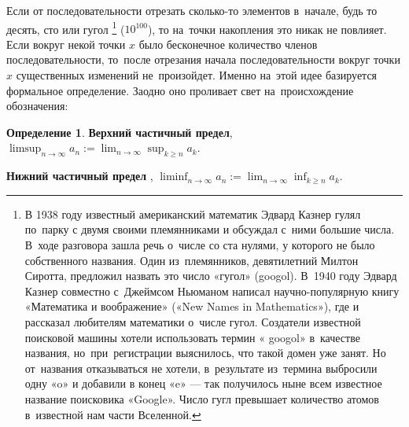 \documentclass[pdftex, 12pt, a4paper]{article}
\renewcommand{\to}{\rightarrow}
\renewcommand{\geq}{\geqslant}
\theoremstyle{definition} %
\newtheorem*{mydef}{Определение}
\numberwithin{problem}{section}
\newcommand{\indef}[1]{\textbf{#1}}
\numberwithin{blits}{section}
\begin{document}
Если от последовательности отрезать сколько-то элементов в~начале, будь то десять, сто или гугол \footnote{В 1938 году известный американский математик Эдвард Казнер гулял по~парку с двумя своими племянниками и обсуждал с~ними большие числа. В~ходе разговора зашла речь о~числе со ста нулями, у которого не было собственного названия. Один из~племянников, девятилетний Милтон Сиротта, предложил назвать это число «гугол» (googol). В~1940 году Эдвард Казнер совместно с~Джеймсом Ньюманом написал научно-популярную книгу «Математика и воображение» («New Names in Mathematics»), где и рассказал любителям математики о~числе гугол. Создатели известной поисковой машины хотели использовать термин « googol» в~качестве названия, но~при~регистрации выяснилось, что такой домен уже занят. Но от~названия отказываться не хотели, в~результате из~термина выбросили одну «o» и добавили в конец «e» — так получилось ныне всем известное название поисковика «Google». Число гугл превышает количество атомов в~известной нам части Вселенной.} ($10^{100}$), то на~точки накопления это никак не повлияет. Если вокруг некой точки $x$ было бесконечное количество членов последовательности, то~после отрезания начала последовательности вокруг точки $x$ существенных изменений не~произойдет. Именно на~этой идее базируется формальное определение. Заодно оно проливает свет на~происхождение обозначения:

\begin{mydef}
\indef{Верхний частичный предел},  $\displaystyle\limsup_{n \to \infty} a_{n}:=\displaystyle\lim_{n\to\infty}\sup_{k\geq n}a_{k}$.

\indef{Нижний частичный предел} , $\displaystyle\liminf_{n \to \infty} a_{n}:=\displaystyle\lim_{n\to\infty}\inf_{k\geq n}a_{k}$.
\end{mydef}
\end{document}
